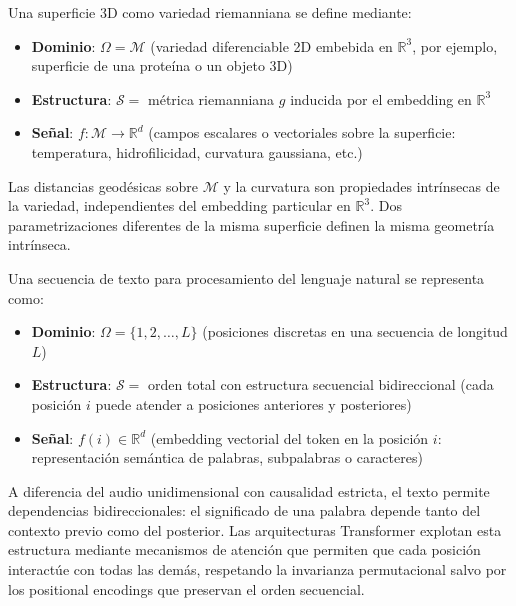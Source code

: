 \begin{example}\label{ex:superficie_riemanniana}
Una superficie 3D como variedad riemanniana se define mediante:
\begin{itemize}
	\item \textbf{Dominio}: $\Omega = \mathcal{M}$ (variedad diferenciable 2D embebida en $\mathbb{R}^3$, por ejemplo, superficie de una proteína o un objeto 3D)
	\item \textbf{Estructura}: $\mathcal{S} = $ métrica riemanniana $g$ inducida por el embedding en $\mathbb{R}^3$
	\item \textbf{Señal}: $f: \mathcal{M} \to \mathbb{R}^d$ (campos escalares o vectoriales sobre la superficie: temperatura, hidrofilicidad, curvatura gaussiana, etc.)
\end{itemize}

Las distancias geodésicas sobre $\mathcal{M}$ y la curvatura son propiedades intrínsecas de la variedad, independientes del embedding particular en $\mathbb{R}^3$. Dos parametrizaciones diferentes de la misma superficie definen la misma geometría intrínseca.
\end{example}

\begin{example}\label{ex:secuencia_texto}
Una secuencia de texto para procesamiento del lenguaje natural se representa como:
\begin{itemize}
	\item \textbf{Dominio}: $\Omega = \{1, 2, \ldots, L\}$ (posiciones discretas en una secuencia de longitud $L$)
	\item \textbf{Estructura}: $\mathcal{S} = $ orden total con estructura secuencial bidireccional (cada posición $i$ puede atender a posiciones anteriores y posteriores)
	\item \textbf{Señal}: $f(i) \in \mathbb{R}^d$ (embedding vectorial del token en la posición $i$: representación semántica de palabras, subpalabras o caracteres)
\end{itemize}

A diferencia del audio unidimensional con causalidad estricta, el texto permite dependencias bidireccionales: el significado de una palabra depende tanto del contexto previo como del posterior. Las arquitecturas \gls{Transformer} explotan esta estructura mediante mecanismos de atención que permiten que cada posición interactúe con todas las demás, respetando la invarianza permutacional salvo por los positional encodings que preservan el orden secuencial.
\end{example}

